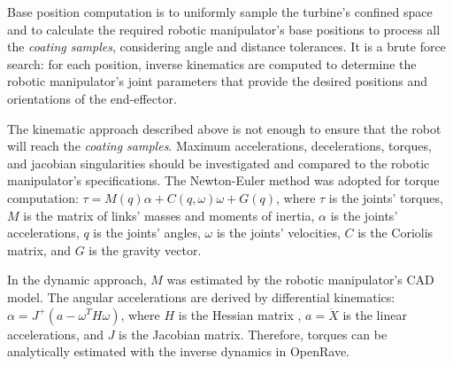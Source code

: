 Base position computation is to uniformly sample the turbine's
confined space and to calculate the required robotic manipulator's base
positions to process all the \textit{coating samples},  considering angle and
distance tolerances. It is a brute force search: for each position, inverse
kinematics are computed to determine the robotic manipulator's joint parameters that provide
the desired positions and orientations of the end-effector.

The kinematic approach described above is not enough to ensure that the robot
will reach the \textit{coating samples}. Maximum accelerations, decelerations,
torques, and jacobian singularities should be investigated and compared to the robotic
manipulator's specifications. The Newton-Euler method
\cite{sciavicco2000differential} was adopted for torque computation: $\tau =
M(q)\alpha + C(q,\omega)\omega + G(q)$, where $\tau$ is the joints' torques,
$M$ is the matrix of links' masses and moments of inertia, $\alpha$ is the
joints' accelerations, $q$ is the joints' angles, $\omega$ is the joints'
velocities, $C$ is the Coriolis matrix, and $G$ is the gravity vector.

In the dynamic approach, $M$ was estimated by the robotic manipulator's CAD
model. The angular accelerations are derived by differential kinematics:
$\alpha=J^+(a-\omega^TH\omega)$, where $H$ is the Hessian matrix
\cite{hourtash2005kinematic}, $a=\ddot{X}$ is the linear accelerations, and $J$
is the Jacobian matrix. Therefore, torques can be analytically estimated with
the inverse dynamics in OpenRave. 

% 

